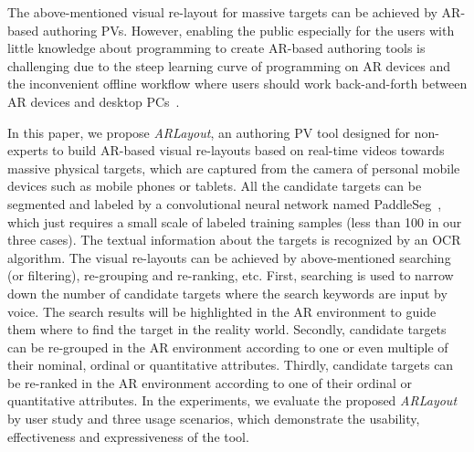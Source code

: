 The above-mentioned visual re-layout for massive targets can be achieved by AR-based authoring PVs.
However, enabling the public especially for the users
with little knowledge about programming
to create AR-based authoring tools is challenging
due to the steep learning curve of programming on AR devices
and the inconvenient offline workflow where users should
work back-and-forth between AR devices and desktop PCs~\cite{Chen2020}.


In this paper, we propose \textit{ARLayout}, an authoring PV tool designed
for non-experts to build AR-based visual re-layouts based on real-time videos
towards massive physical targets,
which are captured from the camera of personal mobile devices such as mobile phones or tablets.
All the candidate targets can be segmented and labeled by
a convolutional neural network named PaddleSeg~\cite{Liu2019,Liu2021a},
which just requires a small scale of labeled training samples (less than 100 in our three cases).
The textual information about the targets is recognized by an OCR algorithm.
The visual re-layouts can be achieved by above-mentioned
searching (or filtering), re-grouping and re-ranking, etc.
First, searching is used to narrow down the number of candidate targets
where the search keywords are input by voice.
The search results will be highlighted in the AR environment to guide them where to find
the target in the reality world.
Secondly, candidate targets can be re-grouped in the AR environment according to one or even multiple of their
nominal, ordinal or quantitative attributes.
Thirdly, candidate targets can be re-ranked in the AR environment according to one of
their ordinal or quantitative attributes.
In the experiments, we evaluate the proposed \textit{ARLayout} by
user study and three usage scenarios,
which demonstrate the usability, effectiveness and expressiveness of the tool.






